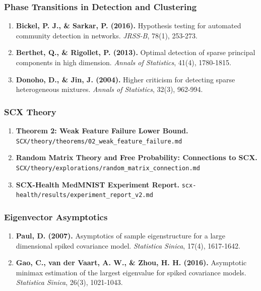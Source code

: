 \documentclass[
  12pt,
]{article}
\begin{document}
\subsubsection{Phase Transitions in Detection and
Clustering}\label{phase-transitions-in-detection-and-clustering}

\begin{enumerate}
\def\labelenumi{\arabic{enumi}.}
\setcounter{enumi}{9}
\item
  \textbf{Bickel, P. J., \& Sarkar, P. (2016).} Hypothesis testing for
  automated community detection in networks. \emph{JRSS-B}, 78(1),
  253-273.
\item
  \textbf{Berthet, Q., \& Rigollet, P. (2013).} Optimal detection of
  sparse principal components in high dimension. \emph{Annals of
  Statistics}, 41(4), 1780-1815.
\item
  \textbf{Donoho, D., \& Jin, J. (2004).} Higher criticism for detecting
  sparse heterogeneous mixtures. \emph{Annals of Statistics}, 32(3),
  962-994.
\end{enumerate}

\subsubsection{SCX Theory}\label{scx-theory}

\begin{enumerate}
\def\labelenumi{\arabic{enumi}.}
\setcounter{enumi}{12}
\item
  \textbf{Theorem 2: Weak Feature Failure Lower Bound.}
  \texttt{SCX/theory/theorems/02\_weak\_feature\_failure.md}
\item
  \textbf{Random Matrix Theory and Free Probability: Connections to
  SCX.} \texttt{SCX/theory/explorations/random\_matrix\_connection.md}
\item
  \textbf{SCX-Health MedMNIST Experiment Report.}
  \texttt{scx-health/results/experiment\_report\_v2.md}
\end{enumerate}

\subsubsection{Eigenvector Asymptotics}\label{eigenvector-asymptotics}

\begin{enumerate}
\def\labelenumi{\arabic{enumi}.}
\setcounter{enumi}{15}
\item
  \textbf{Paul, D. (2007).} Asymptotics of sample eigenstructure for a
  large dimensional spiked covariance model. \emph{Statistica Sinica},
  17(4), 1617-1642.
\item
  \textbf{Gao, C., van der Vaart, A. W., \& Zhou, H. H. (2016).}
  Asymptotic minimax estimation of the largest eigenvalue for spiked
  covariance models. \emph{Statistica Sinica}, 26(3), 1021-1043.
\end{enumerate}
\end{document}
